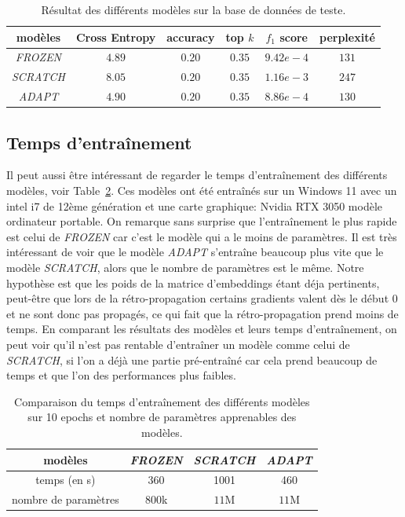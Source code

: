\documentclass[a4paper]{article}
\begin{document}
\begin{table}[ht]
    \centering
    \begin{tabular}{|c|c|c|c|c|c|}
        \hline
        modèles & Cross Entropy & accuracy & top $k$ & $f_1$ score & perplexité \\
        \hline
        \textit{FROZEN} & $4.89$ &  $0.20$ & $0.35$ & $9.42e-4$ & $131$ \\
        \textit{SCRATCH} & $8.05$ &  $0.20$ & $0.35$ & $1.16e-3$ & $247$ \\
        \textit{ADAPT} & $4.90$ &  $0.20$ & $0.35$ & $8.86e-4$ & $130$ \\
        \hline
    \end{tabular}
    \caption{Résultat des différents modèles sur la base de données de teste.}
    \label{tab:test}
\end{table}

\subsection{Temps d'entraînement}

Il peut aussi être intéressant de regarder le temps d'entraînement des différents modèles, voir Table~\ref{tab:times}. Ces modèles ont été
entraînés sur un Windows 11 avec un intel i7 de 12ème génération et une carte graphique: Nvidia RTX 3050 modèle ordinateur portable.
On remarque sans surprise que l'entraînement le plus rapide est celui de \textit{FROZEN} car c'est le modèle qui a le moins de paramètres.
Il est très intéressant de voir que le modèle \textit{ADAPT} s'entraîne beaucoup plus vite que le modèle \textit{SCRATCH}, alors que le
nombre de paramètres est le même. Notre hypothèse est que les poids de la matrice d'embeddings étant déja pertinents, peut-être que lors 
de la rétro-propagation certains gradients valent dès le début 0 et ne sont donc pas propagés, ce qui fait que la rétro-propagation prend 
moins de temps.
En comparant les résultats des modèles et leurs temps d'entraînement, on peut voir qu'il n'est pas rentable d'entraîner un modèle comme
celui de \textit{SCRATCH}, si l'on a déjà une partie pré-entraîné car cela prend beaucoup de temps et que l'on des performances 
plus faibles.

\begin{table}[ht]
    \centering
    \begin{tabular}{|c|c|c|c|}
        \hline
        modèles & \textit{FROZEN} & \textit{SCRATCH} & \textit{ADAPT} \\
        \hline
        temps (en s) & 360 & 1001 & 460 \\
        \hline
        nombre de paramètres & $800$k & $11$M & $11$M \\
        \hline
    \end{tabular}
    \caption{Comparaison du temps d'entraînement des différents modèles sur 10 epochs et nombre de paramètres apprenables des modèles.}
    \label{tab:times}
\end{table}


\newpage

\printbibliography
\end{document}
